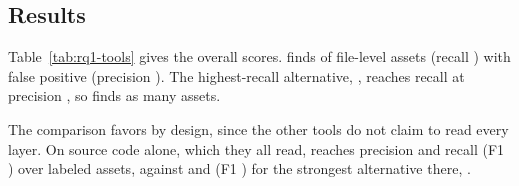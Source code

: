 \subsection{Results}

\begin{table}[t]
\centering\small

\caption{Precision (P), recall (R) and F1 on all  corpus
cases. File level matches file and algorithm family; line level also matches
the line.}
\label{tab:rq1-tools}
\end{table}

\begin{table}[t]
\centering\small\setlength{\tabcolsep}{4pt}

\caption{File-level recall by layer and source language. Only \tool{} probes
network endpoints.}
\label{tab:rq1-layers}
\end{table}

Table~\ref{tab:rq1-tools} gives the overall scores. \tool{} finds
 of  file-level assets
(recall ) with  false
positive (precision ). The highest-recall
alternative, , reaches recall
 at precision
, so \tool{} finds  as
many assets.

The comparison favors \tool{} by design, since the other tools do not claim
to read every layer. On source code alone, which they all read, \tool{}
reaches precision  and recall
 (F1 ) over
 labeled assets, against  and
 (F1 ) for the strongest
alternative there, .

